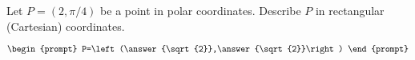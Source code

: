 \documentclass{ximera}
\author{Gregory Hartman \and Matthew Carr}
\begin{document}
\begin{exercise}





Let $P=(2,\pi/4)$ be a point in polar coordinates. Describe $P$ in rectangular (Cartesian) coordinates.

\[
\begin{prompt}
P=\left(\answer{\sqrt{2}},\answer{\sqrt{2}}\right)
\end{prompt}
\]

\end{exercise}
\end{document}
